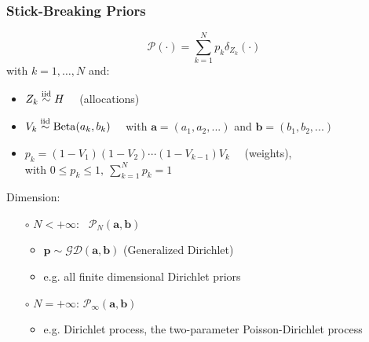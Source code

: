 	

\begin{frame}
	\frametitle{Stick-Breaking Priors}
	$$\mathscr{P}(\cdot)= \sum\limits_{k=1}^N
	\mathit{p_{k}}\delta_{Z_{k}}(\cdot)$$
	with $k=1,\dots,N$ and:
	\begin{itemize}
		\item $Z_k \stackrel{\text{iid}}{\sim} H \quad$ (allocations)
		\item $V_k  \stackrel{\text{iid}}{\sim} \operatorname{Beta}(a_{k},b_{k}) \quad$ with $\mathbf{a}=(a_{1},a_{2},...)$ and $\mathbf{b}=(b_{1},b_{2},...)$
		\item $p_k = (1-V_{1}) (1-V_{2}) \cdots (1-V_{k-1}) V_k \quad$ (weights), \\[8pt] %
		with $0 \leq p_k \leq 1, \ \sum_{k=1}^N p_k = 1$
	\end{itemize}
	Dimension:
   	\begin{itemize}
   	    \item[$\circ$] $N<+\infty$: \ $\mathscr{P}_{N}(\mathbf{a},\mathbf{b})$
   	    \begin{itemize}
   	        \item $\mathbf{p} \sim \mathscr{GD}(\mathbf{a},\mathbf{b})$ (Generalized Dirichlet)
   	        \item e.g. all finite dimensional Dirichlet priors
   	    \end{itemize}
   	    \item[$\circ$] $N=+\infty$: $\mathscr{P}_{\infty}(\mathbf{a},\mathbf{b})$
   	    \begin{itemize}
   	        \item e.g. Dirichlet process, the two-parameter Poisson-Dirichlet process
   	    \end{itemize}
   	\end{itemize}
\end{frame}


